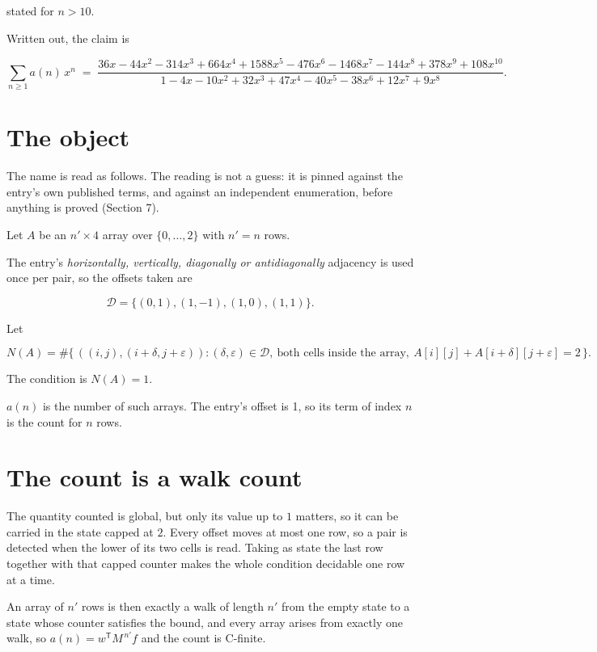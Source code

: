 \documentclass[11pt]{article}
\theoremstyle{definition}
\begin{document}
stated for $n > 10$.

Written out, the claim is

\[\sum_{n \ge 1} a(n)\,x^n \;=\; \frac{36x - 44x^{2} - 314x^{3} + 664x^{4} + 1588x^{5} - 476x^{6} - 1468x^{7} - 144x^{8} + 378x^{9} + 108x^{10}}{1 - 4x - 10x^{2} + 32x^{3} + 47x^{4} - 40x^{5} - 38x^{6} + 12x^{7} + 9x^{8}}.\]

\section{The object}

The name is read as follows. The reading is not a guess: it is pinned against the entry's own published terms, and against an independent enumeration, before anything is proved (Section 7).

Let $A$ be an $n' \times 4$ array over $\{0,\dots,2\}$ with $n' = n$ rows.

The entry's {\itshape horizontally, vertically, diagonally or antidiagonally} adjacency is used once per pair, so the offsets taken are

\[\mathcal{D} = \{(0,1), (1,-1), (1,0), (1,1)\}.\]

Let

\[N(A) = \#\bigl\{\,((i,j),(i{+}\delta,j{+}\varepsilon)) : (\delta,\varepsilon) \in \mathcal{D},\ \text{both cells inside the array},\ A[i][j] + A[i{+}\delta][j{+}\varepsilon] = 2\,\bigr\}.\]

The condition is $N(A) = 1$.

$a(n)$ is the number of such arrays. The entry's offset is 1, so its term of index $n$ is the count for $n$ rows.

\section{The count is a walk count}

The quantity counted is global, but only its value up to $1$ matters, so it can be carried in the state capped at $2$. Every offset moves at most one row, so a pair is detected when the lower of its two cells is read. Taking as state the last row together with that capped counter makes the whole condition decidable one row at a time.

An array of $n'$ rows is then exactly a walk of length $n'$ from the empty state to a state whose counter satisfies the bound, and every array arises from exactly one walk, so $a(n) = w^{\mathsf T}M^{\,n'}f$ and the count is C-finite.
\end{document}
